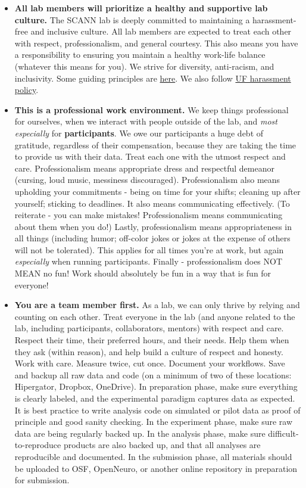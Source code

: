 \documentclass[
  12pt,
]{book}
\begin{document}
\begin{itemize}
\item
  \textbf{All lab members will prioritize a healthy and supportive lab culture.}
  The SCANN lab is deeply committed to maintaining a harassment-free and inclusive culture. All lab members are expected to treat each other with respect, professionalism, and general courtesy. This also means you have a responsibility to ensuring you maintain a healthy work-life balance (whatever this means for you). We strive for diversity, anti-racism, and inclusivity. Some guiding principles are \href{https://coco-net.org/wp-content/uploads/2019/11/Coco-WhiteSupCulture-ENG4.pdf}{here}. We also follow \href{https://hr.ufl.edu/forms-policies/policies-managers/sexual-harassment/}{UF harassment policy}.
\item
  \textbf{This is a professional work environment.}
  We keep things professional for ourselves, when we interact with people outside of the lab, and \emph{most especially} for \textbf{participants}. We owe our participants a huge debt of gratitude, regardless of their compensation, because they are taking the time to provide us with their data. Treat each one with the utmost respect and care. Professionalism means appropriate dress and respectful demeanor (cursing, loud music, messiness discouraged). Professionalism also means upholding your commitments - being on time for your shifts; cleaning up after yourself; sticking to deadlines. It also means communicating effectively. (To reiterate - you can make mistakes! Professionalism means communicating about them when you do!) Lastly, professionalism means appropriateness in all things (including humor; off-color jokes or jokes at the expense of others will not be tolerated). This applies for all times you're at work, but again \emph{especially} when running participants. Finally - professionalism does NOT MEAN no fun! Work should absolutely be fun in a way that is fun for everyone!
\item
  \textbf{You are a team member first.}
  As a lab, we can only thrive by relying and counting on each other. Treat everyone in the lab (and anyone related to the lab, including participants, collaborators, mentors) with respect and care. Respect their time, their preferred hours, and their needs. Help them when they ask (within reason), and help build a culture of respect and honesty.
  Work with care. Measure twice, cut once. Document your workflows. Save and backup all raw data and code (on a minimum of two of these locations: Hipergator, Dropbox, OneDrive). In preparation phase, make sure everything is clearly labeled, and the experimental paradigm captures data as expected. It is best practice to write analysis code on simulated or pilot data as proof of principle and good sanity checking. In the experiment phase, make sure raw data are being regularly backed up. In the analysis phase, make sure difficult-to-reproduce products are also backed up, and that all analyses are reproducible and documented. In the submission phase, all materials should be uploaded to OSF, OpenNeuro, or another online repository in preparation for submission.

\end{itemize}
\end{document}
